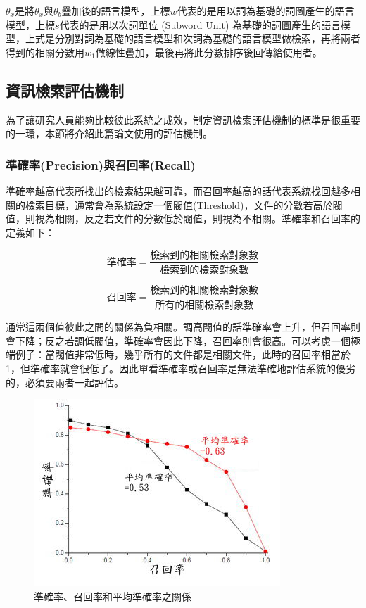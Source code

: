 $\bar{\theta}_x$是將$\theta_x$與$\theta_b$疊加後的語言模型，上標$w$代表的是用以詞為基礎的詞圖產生的語言模型，上標$s$代表的是用以次詞單位 (Subword Unit) 為基礎的詞圖產生的語言模型，上式是分別對詞為基礎的語言模型和次詞為基礎的語言模型做檢索，再將兩者得到的相關分數用$w_1$做線性疊加，最後再將此分數排序後回傳給使用者。

\subsection{資訊檢索評估機制}
為了讓研究人員能夠比較彼此系統之成效，制定資訊檢索評估機制的標準是很重要的一環，本節將介紹此篇論文使用的評估機制。

\subsubsection{準確率(Precision)與召回率(Recall)}

準確率越高代表所找出的檢索結果越可靠，而召回率越高的話代表系統找回越多相關的檢索目標，通常會為系統設定一個閥值(Threshold)，文件的分數若高於閥值，則視為相關，反之若文件的分數低於閥值，則視為不相關。準確率和召回率的定義如下：

\[
\text{準確率}=\frac{\text{檢索到的相關檢索對象數}}{\text{檢索到的檢索對象數}}
\]

\[
\text{召回率}=\frac{\text{檢索到的相關檢索對象數}}{\text{所有的相關檢索對象數}}
\]

通常這兩個值彼此之間的關係為負相關。調高閥值的話準確率會上升，但召回率則會下降；反之若調低閥值，準確率會因此下降，召回率則會很高。可以考慮一個極端例子：當閥值非常低時，幾乎所有的文件都是相關文件，此時的召回率相當於1，但準確率就會很低了。因此單看準確率或召回率是無法準確地評估系統的優劣的，必須要兩者一起評估。

\begin{figure}
\centering
\includegraphics[scale=1.0]{images/chap2_precision_recall.png}
\caption{準確率、召回率和平均準確率之關係} \label{fig:precision_recall}
\end{figure}

